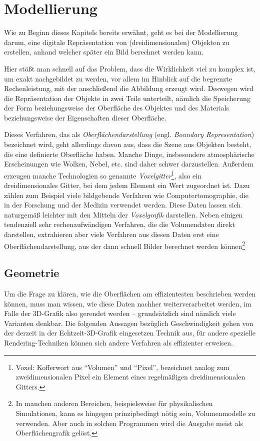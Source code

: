 \section{Modellierung}
Wie zu Beginn dieses Kapitels bereits erwähnt, geht es bei der Modellierung darum, eine digitale Repräsentation von (dreidimensionalen) Objekten zu erstellen, anhand welcher später ein Bild berechnet werden kann.

Hier stößt man schnell auf das Problem, dass die Wirklichkeit viel zu komplex ist, um exakt nachgebildet zu werden, vor allem im Hinblick auf die begrenzte Rechenleistung, mit der anschließend die Abbildung erzeugt wird. Deswegen wird die Repräsentation der Objekte in zwei Teile unterteilt, nämlich die Speicherung der Form beziehungsweise der Oberfläche des Objektes und des Materials beziehungsweise der Eigenschaften dieser Oberfläche.

Dieses Verfahren, das als \emph{Oberflächendarstellung} (engl. \emph{Boundary Representation}) bezeichnet wird, geht allerdings davon aus, dass die Szene aus Objekten besteht, die eine definierte Oberfläche haben. Manche Dinge, insbesondere atmosphärische Erscheinungen wie Wolken, Nebel, etc. sind daher schwer darzustellen. Außerdem erzeugen manche Technologien so genannte \emph{Voxelgitter}\footnote{Voxel: Kofferwort aus \enquote{Volumen} und \enquote{Pixel}, bezeichnet analog zum zweidimensionalen Pixel ein Element eines regelmäßigen dreidimensionalen Gitters.}, also ein dreidimensionales Gitter, bei dem jedem Element ein Wert zugeordnet ist. Dazu zählen zum Beispiel viele bildgebende Verfahren wie Computertomographie, die in der Forschung und der Medizin verwendet werden. Diese Daten lassen sich naturgemäß leichter mit den Mitteln der \emph{Voxelgrafik} darstellen. Neben einigen tendenziell sehr rechenaufwändigen Verfahren, die die Volumendaten direkt darstellen, extrahieren aber viele Verfahren aus diesen Daten erst eine Oberflächendarstellung, aus der dann schnell Bilder berechnet werden können\footnote{In manchen anderen Bereichen, beispielsweise für physikalischen Simulationen, kann es hingegen prinzipbedingt nötig sein, Volumenmodelle zu verwenden. Aber auch in solchen Programmen wird die Ausgabe meist als Oberflächengrafik gelöst.}

\subsection{Geometrie}
Um die Frage zu klären, wie die Oberflächen am effizientesten beschrieben werden können, muss man wissen, wie diese Daten nachher weiterverarbeitet werden, im Falle der 3D-Grafik also gerendet werden -- grundsätzlich sind nämlich viele Varianten denkbar. Die folgenden Aussagen bezüglich Geschwindigkeit gehen von der derzeit in der Echtzeit-3D-Grafik eingesetzen Technik aus, für andere spezielle Rendering-Techniken können sich andere Verfahren als effizienter erweisen.

